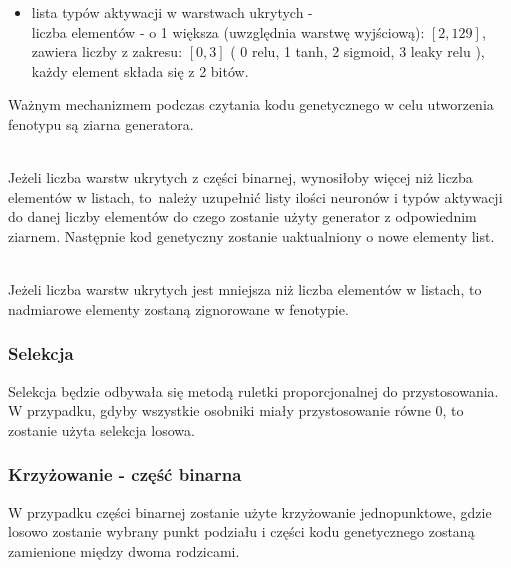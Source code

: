 \begin{itemize}
\begin{itemize}
        \hspace*{1em}każdy element składa się z 10 bitów.
      \item lista typów aktywacji w warstwach ukrytych -\\
        \hspace*{1em}liczba elementów - o 1 większa
          (uwzględnia warstwę wyjściową):
          $\left[2, 129\right]$,\\
        \hspace*{1em}zawiera liczby z zakresu:
          $\left[0, 3\right]$
          (%
            0 \textrightarrow relu,
            1 \textrightarrow tanh,
            2 \textrightarrow sigmoid,
            3 \textrightarrow leaky relu%
          ),\\
        \hspace*{1em}każdy element składa się z 2 bitów.
    \end{itemize}
\end{itemize}
Ważnym mechanizmem podczas czytania kodu genetycznego
w celu utworzenia fenotypu są ziarna generatora.

\noindent\\
Jeżeli liczba warstw ukrytych z części binarnej,
wynosiłoby więcej niż liczba elementów w listach,
to~należy uzupełnić listy ilości neuronów
i typów aktywacji do danej liczby elementów do czego zostanie
użyty generator z odpowiednim ziarnem.
Następnie kod genetyczny zostanie uaktualniony o nowe elementy list.

\noindent\\
Jeżeli liczba warstw ukrytych jest mniejsza niż liczba elementów w listach,
to nadmiarowe elementy zostaną zignorowane w fenotypie.

\subsubsection{Selekcja}
Selekcja będzie odbywała się metodą ruletki proporcjonalnej do przystosowania.
W przypadku, gdyby wszystkie osobniki miały przystosowanie równe 0,
to zostanie użyta selekcja losowa.

\subsubsection{Krzyżowanie - część binarna}
W przypadku części binarnej zostanie użyte krzyżowanie jednopunktowe,
gdzie losowo zostanie wybrany punkt podziału i
części kodu genetycznego zostaną zamienione między dwoma rodzicami.


